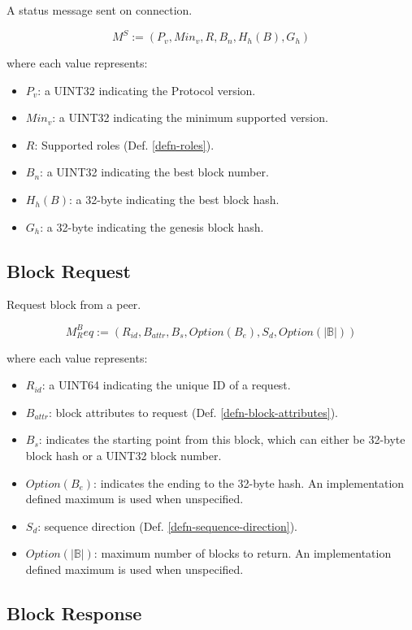 \documentclass{book}
\begin{document}
A status message sent on connection.

\[
    M^S := (P_v, Min_v, R, B_n, H_h(B), G_h)
\]

where each value represents:

\begin{itemize}
    \item $P_v$: a UINT32 indicating the Protocol version.
    \item $Min_v$: a UINT32 indicating the minimum supported version.
    \item $R$: Supported roles (Def. \ref{defn-roles}).
    \item $B_n$: a UINT32 indicating the best block number.
    \item $H_h(B)$: a 32-byte indicating the best block hash.
    \item $G_h$: a 32-byte indicating the genesis block hash.
\end{itemize}

\subsection{Block Request}\label{sect-block-request}

Request block from a peer.

\[
    M^B_Req := (R_{id}, B_{attr}, B_s, Option(B_e), S_d, Option(|\mathbb{B}|))
\]

where each value represents:

\begin{itemize}
    \item $R_{id}$: a UINT64 indicating the unique ID of a request.
    \item $B_{attr}$: block attributes to request (Def.
    \ref{defn-block-attributes}).
    \item $B_s$: indicates the starting point from this block, which can either
    be 32-byte block hash or a UINT32 block number.
    \item $Option(B_e)$: indicates the ending to the 32-byte hash. An
    implementation defined maximum is used when unspecified.
    \item $S_d$: sequence direction (Def. \ref{defn-sequence-direction}). 
    \item $Option(|\mathbb{B}|)$: maximum number of blocks to return. An implementation
    defined maximum is used when unspecified.
\end{itemize}

\subsection{Block Response}
\end{document}
